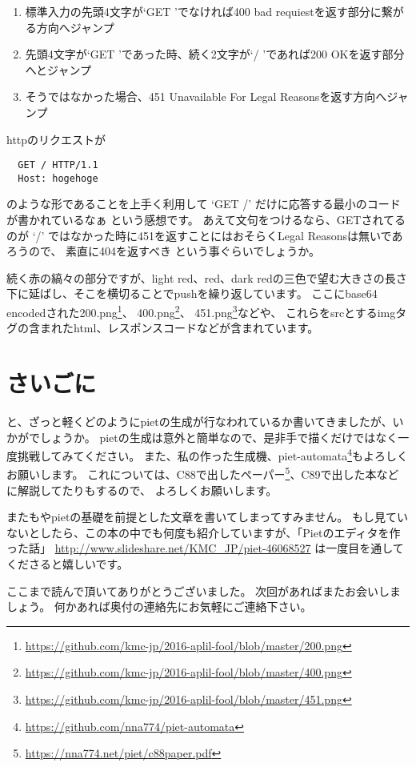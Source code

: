 \begin{enumerate}
  \item 標準入力の先頭4文字が`GET 'でなければ400 bad requiestを返す部分に繋がる方向へジャンプ
  \item 先頭4文字が`GET 'であった時、続く2文字が`/ 'であれば200 OKを返す部分へとジャンプ
  \item そうではなかった場合、451 Unavailable For Legal Reasonsを返す方向へジャンプ
\end{enumerate}

httpのリクエストが
\begin{lstlisting}
  GET / HTTP/1.1
  Host: hogehoge
\end{lstlisting}
のような形であることを上手く利用して `GET /' だけに応答する最小のコードが書かれているなぁ という感想です。
あえて文句をつけるなら、GETされてるのが `/' ではなかった時に451を返すことにはおそらくLegal Reasonsは無いであろうので、
素直に404を返すべき という事ぐらいでしょうか。

続く赤の縞々の部分ですが、light red、red、dark redの三色で望む大きさの長さ下に延ばし、そこを横切ることでpushを繰り返しています。
ここにbase64 encodedされた200.png\footnote{\url{https://github.com/kmc-jp/2016-aplil-fool/blob/master/200.png}}、
400.png\footnote{\url{https://github.com/kmc-jp/2016-aplil-fool/blob/master/400.png}}、
451.png\footnote{\url{https://github.com/kmc-jp/2016-aplil-fool/blob/master/451.png}}などや、
これらをsrcとするimgタグの含まれたhtml、レスポンスコードなどが含まれています。

\section{さいごに}

と、ざっと軽くどのようにpietの生成が行なわれているか書いてきましたが、いかがでしょうか。
pietの生成は意外と簡単なので、是非手で描くだけではなく一度挑戦してみてください。
また、私の作った生成機、piet-automata\footnote{\url{https://github.com/nna774/piet-automata}}もよろしくお願いします。
これについては、C88で出したペーパー\footnote{\url{https://nna774.net/piet/c88paper.pdf}}、C89で出した本などに解説してたりもするので、
よろしくお願いします。

またもやpietの基礎を前提とした文章を書いてしまってすみません。
もし見ていないとしたら、この本の中でも何度も紹介していますが、「Pietのエディタを作った話」
\url{http://www.slideshare.net/KMC_JP/piet-46068527}
は一度目を通してくださると嬉しいです。

ここまで読んで頂いてありがとうございました。
次回があればまたお会いしましょう。
何かあれば奥付の連絡先にお気軽にご連絡下さい。
